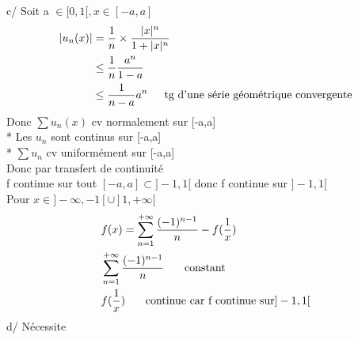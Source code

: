 \documentclass{article}
\begin{document}
c/ Soit a \(\in [0,1[, x \in [-a, a]\)\begin{align*}
    |u_n(x)| &= \frac{1}{n}\times \frac{|x|^n}{1+|x|^n}\\
    &\leq \frac{1}{n}\frac{a^n}{1-a} \\
    &\leq \frac{1}{n-a}a^n \indent \text{tg d'une série géométrique convergente}
\end{align*}
Donc \(\sum u_n(x)\) cv normalement sur [-a,a]\\
* Les \(u_n\) sont continus sur [-a,a]\\
* \(\sum u_n\) cv uniformément sur [-a,a]\\
Donc par transfert de continuité\\
f continue sur tout \([-a,a]\subset ]-1, 1[\) donc f continue sur \(]-1, 1[\)\\
Pour \(x \in ]-\infty, -1[\cup]1, +\infty[\)\begin{align*}
    &f(x) = \sum_{n=1}^{+\infty} \frac{(-1)^{n-1}}{n} - f(\frac{1}{x})\\
    &\sum_{n=1}^{+\infty} \frac{(-1)^{n-1}}{n} \indent \text{ constant}\\
    &f(\frac{1}{x}) \indent \text{ continue car f continue sur} ]-1, 1[
\end{align*}
d/ Nécessite 
\end{document}
